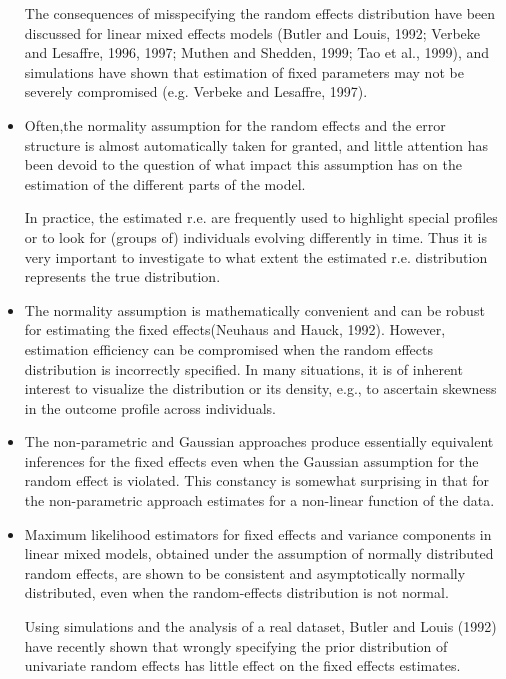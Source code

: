 \documentclass{article}
\begin{document}
\begin{itemize}
The consequences of misspecifying the random effects distribution have been discussed for linear mixed effects models (Butler and Louis, 1992; Verbeke and Lesaffre, 1996, 1997; Muthen and Shedden, 1999; Tao et al., 1999), and simulations have shown that estimation of fixed parameters may not be severely compromised (e.g. Verbeke and Lesaffre, 1997). 

\item \cite{verbeke1996linear} Often,the normality assumption for the random effects and the error structure is almost automatically taken for granted, and little attention has been devoid to the question of what impact this assumption has on the estimation of the different parts of the model.\par

In practice, the estimated r.e. are frequently used to highlight special profiles or to look for (groups of) individuals evolving differently in time. Thus it is very important to investigate to what extent the estimated r.e. distribution represents the true distribution.\par

\item \cite{tao1999estimation} The normality assumption is mathematically convenient and can be robust for estimating the fixed effects(Neuhaus and Hauck, 1992). However, estimation efficiency can be compromised when the random effects distribution is incorrectly specified. In many situations, it is of inherent interest to visualize the distribution or its density, e.g., to ascertain skewness in the outcome profile across individuals.

\item\cite{butler1992random} The non-parametric and Gaussian approaches produce essentially equivalent inferences for the fixed effects even when the Gaussian assumption for the random effect is violated. This constancy is somewhat surprising in that for the non-parametric approach estimates for a non-linear function of the data.

\item\cite{verbeke1997effect} Maximum likelihood estimators for fixed effects and variance components in linear mixed models, obtained under the assumption of normally distributed random effects, are shown to be consistent and asymptotically normally distributed, even when the random-effects distribution is not normal. \par

Using simulations and the analysis of a real dataset, Butler and Louis (1992) have recently shown that wrongly specifying the prior distribution of univariate random effects has little effect on the fixed effects estimates.\par 


\end{itemize}
\end{document}
